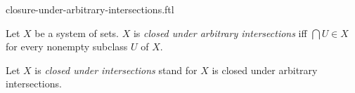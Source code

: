 \documentclass{naproche-library}
\begin{document}
\begin{smodule}[title=Closure Under Arbitrary Intersections]{closure-under-arbitrary-intersections.ftl}

\begin{definition}[forthel,id=FOUNDATIONS_14_2369621166391296]
  Let $X$ be a system of sets.
  $X$ is \emph{closed under arbitrary intersections} iff $\bigcap U \in X$ for every nonempty subclass $U$ of $X$.

  Let $X$ is \emph{closed under intersections} stand for $X$ is closed under arbitrary intersections.
\end{definition}
\end{smodule}
\end{document}
